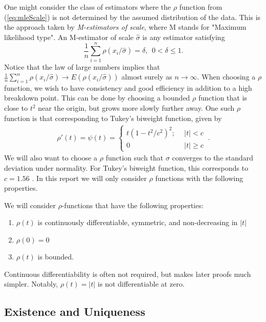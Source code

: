 One might consider the class of estimators where the $\rho$ function from (\ref{eq:mleScale}) is not determined by the assumed distribution of the data. This is the approach taken by \textit{M-estimators of scale}, where M stands for "Maximum likelihood type". An M-estimator of scale $\hat \sigma$ is any estimator satisfying
\begin{equation}
    \label{eq:mScale}
    \frac{1}{n} \sum_{i=1}^n \rho(x_i/\hat \sigma) = \delta,\ \ 0 < \delta \leq 1.
\end{equation}
Notice that the law of large numbers implies that $\frac{1}{n} \sum_{i=1}^n \rho(x_i/\hat \sigma) \xrightarrow{} E(\rho(x_i/\hat \sigma))$ almost surely as $n \xrightarrow{} \infty$. When choosing a $\rho$ function, we wish to have consistency and good efficiency in addition to a high breakdown point. This can be done by choosing a bounded $\rho$ function that is close to $t^2$ near the origin, but grows more slowly further away. One such $\rho$ function is that corresponding to Tukey's biweight function, given by
\begin{align}
    \rho'(t) = \psi(t)  =
    \begin{cases}
        t(1-t^2/c^2)^2; &\ \ |t| < c \\
        0 &\ \ |t| \geq c
    \end{cases}\ .
\end{align}
We will also want to choose a $\rho$ function such that $\sigma$ converges to the standard deviation under normality. For Tukey's biweight function, this corresponds to $c = 1.56$ \cite{maronna2019robust}. In this report we will only consider $\rho$ functions with the following properties.
\begin{defn}
    \label{def:rho}
    We will consider $\rho$-functions that have the following properties:
    \begin{enumerate}[(R1)]
        \item $\rho(t)$ is continuously differentiable, symmetric, and non-decreasing in $|t|$
        \item $\rho(0) = 0$
        \item $\rho(t)$ is bounded.
    \end{enumerate}
\end{defn}
Continuous differentiability is often not required, but makes later proofs much simpler. Notably, $\rho(t) = |t|$ is not differentiable at zero.

\subsection{Existence and Uniqueness}

